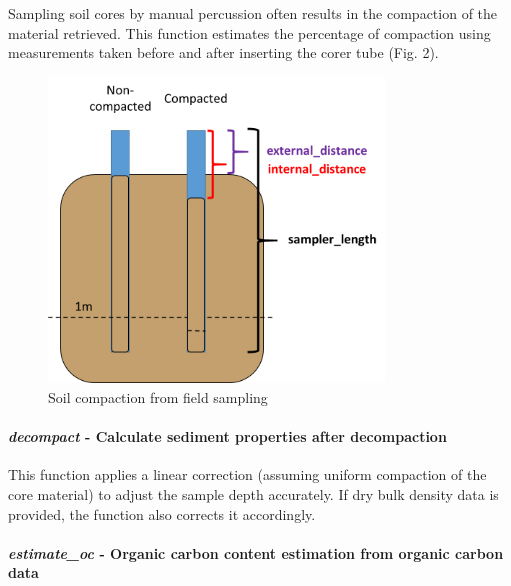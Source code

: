 \documentclass[10pt,a4paper,onecolumn]{article}
\let\oldparagraph\paragraph
\renewcommand{\paragraph}[1]{\oldparagraph{#1}\mbox{}}
\begin{document}
Sampling soil cores by manual percussion often results in the compaction
of the material retrieved. This function estimates the percentage of
compaction using measurements taken before and after inserting the corer
tube (Fig. 2).

\begin{figure}
\centering
\includegraphics[width=3.51042in,height=\textheight,keepaspectratio]{images/compaction-02.png}
\caption{Soil compaction from field sampling}
\end{figure}

\paragraph{\texorpdfstring{\textbf{\emph{decompact}} \textbf{- Calculate
sediment properties after
decompaction}}{decompact - Calculate sediment properties after decompaction}}\label{decompact---calculate-sediment-properties-after-decompaction}

This function applies a linear correction (assuming uniform compaction
of the core material) to adjust the sample depth accurately. If dry bulk
density data is provided, the function also corrects it accordingly.

\paragraph{\texorpdfstring{\textbf{\emph{estimate\_oc}} \textbf{-
Organic carbon content estimation from organic carbon
data}}{estimate\_oc - Organic carbon content estimation from organic carbon data}}\label{estimate_oc---organic-carbon-content-estimation-from-organic-carbon-data}
\end{document}
